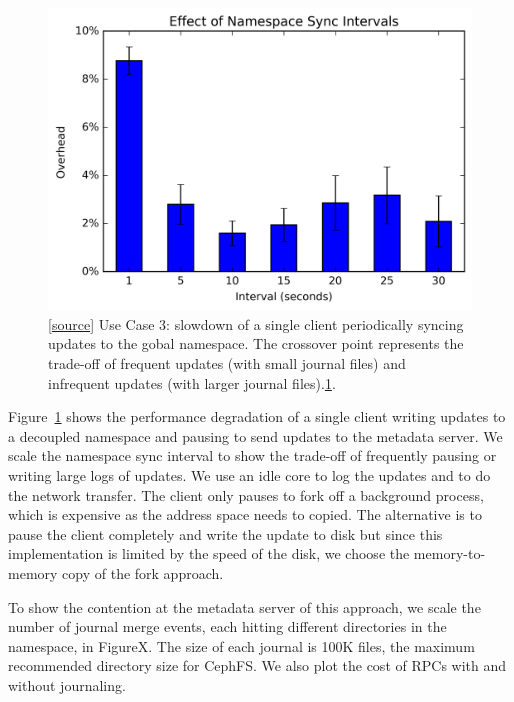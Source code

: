 \begin{figure}[tb] \centering
\includegraphics[width=1.0\linewidth]{graphs/slowdown-sync.png} \caption{
[\href{https://...}{source}] Use Case 3: slowdown of a single client periodically syncing
updates to the gobal namespace. The crossover point represents the trade-off of
frequent updates (with small journal files) and infrequent updates (with larger journal
files).\ref{fig:slowdown-sync}.  \label{fig:slowdown-sync}} \end{figure}

Figure~\ref{fig:slowdown-sync} shows the performance degradation of a single
client writing updates to a decoupled namespace and pausing to send updates to
the metadata server. We scale the namespace sync interval to show the trade-off
of frequently pausing or writing large logs of updates.  We use an idle core to
log the updates and to do the network transfer. The client only pauses to fork
off a background process, which is expensive as the address space needs to
copied. The alternative is to pause the client completely and write the update
to disk but since this implementation is limited by the speed of the disk, we
choose the memory-to-memory copy of the fork approach.

To show the contention at the metadata server of this approach, we scale the
number of journal merge events, each hitting different directories
in the namespace, in FigureX. The size of each journal is 100K files, the
maximum recommended directory size for CephFS. We also plot the cost of RPCs
with and without journaling.

